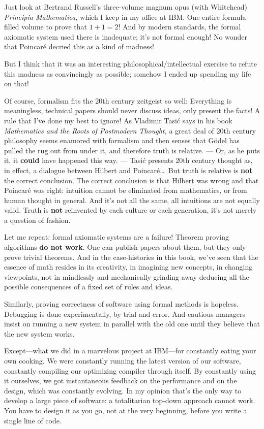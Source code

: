 \documentclass[12pt]{book}
\begin{document}
Just look at Bertrand Russell's three-volume magnum opus (with Whitehead) 
\emph{Principia Mathematica,} which I keep in my office at IBM.  
One entire formula-filled volume to prove that $1 + 1 = 2$!
And by modern standards, the formal axiomatic system used there is inadequate; it's not formal
enough!  
No wonder that Poincar\'e decried this as a kind of madness!
 
But I think that it was an interesting philosophical/intellectual exercise to refute this madness
as convincingly as possible; somehow I ended up spending my life on that!
 
Of course, formalism fits the 20th century zeitgeist so well: Everything is meaningless,
technical papers should never discuss ideas, only present
the facts! A rule that I've done my best to ignore!
As Vladimir Tasi\'c says in his book \emph{Mathematics and the Roots of Postmodern Thought,}
a great deal of 20th century philosophy seems enamored with formalism and then senses
that G\"odel has pulled the rug out from under it, and therefore truth is relative.
--- Or, as he puts it, it \textbf{could} have happened this way. ---
Tasi\'c presents 20th century thought as, in effect, a dialogue between Hilbert and Poincar\'e\ldots\
But truth is relative is \textbf{not} the correct conclusion. The correct conclusion is that Hilbert was
wrong and that Poincar\'e was right: intuition cannot be eliminated from mathematics,
or from human thought in general. And it's not all the same, all intuitions are not equally valid.
Truth is \textbf{not} reinvented by each culture or each generation, 
it's not merely a question of fashion.
 
Let me repeat: formal axiomatic systems are a failure!  Theorem proving algorithms \textbf{do not
work}.  One can publish papers about them, but they only prove trivial 
theorems.  
And in the case-histories in this book,
we've seen that
the essence of math resides in its creativity, in imagining new concepts, in changing viewpoints,
not in mindlessly and mechanically grinding away deducing all the 
possible consequences of a fixed set of rules and ideas.
 
Similarly, proving correctness of software using formal methods is
hopeless.  Debugging is done experimentally, by trial and error.
And cautious managers insist on running a new system in parallel 
with the old one
until they believe that the new system works.  
 
Except---what we did in a marvelous project at IBM---for constantly eating
your own cooking. We were constantly running the latest version of our software,
constantly compiling our optimizing compiler through itself.
By constantly using it ourselves, we got instantaneous feedback on the performance
and on the design,
which was constantly evolving.
In my opinion that's the only way to develop a large piece of software:
a totalitarian top-down approach cannot work.
You have to design it as you go, not at the very beginning,
before you write a single line of code.
 
\end{document}
